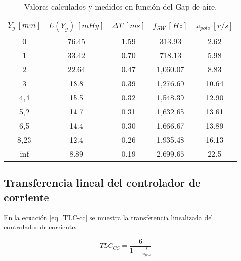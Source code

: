 \begin{table}[H]
	\begin{center}
		\begin{tabular}{| c | c | c | c | c |}
			\hline
			$Y_g\:[mm]$ & $L(Y_g)\:[mHy]$ & $\Delta T\:[ms]$ & $f_{SW}\:[Hz]$ & $\omega _{polo}\:[r/s]$\\ \hline
			0 & 76.45 & 1.59 & 313.93 & 2.62\\ \hline
			1 & 33.42 & 0.70 & 718.13 & 5.98\\ \hline
			2 & 22.64 &	0.47 & 1,060.07 & 8.83\\ \hline
			3 &	18.8 & 0.39 & 1,276.60 & 10.64\\ \hline
			4,4 & 15.5 & 0.32 & 1,548.39 & 12.90\\ \hline
			5,2 & 14.7 & 0.31 & 1,632.65 & 13.61\\ \hline
			6,5 & 14.4 & 0.30 & 1,666.67 & 13.89\\ \hline
			8,23 & 12.4 & 0.26 & 1,935.48 & 16.13\\ \hline
			inf & 8.89 & 0.19 & 2,699.66 & 22.5	\\ \hline
		\end{tabular}
		\caption{Valores calculados y medidos en función del Gap de aire.}
		\label{tab_mediciones}
	\end{center}
\end{table}

\subsection{Transferencia lineal del controlador de corriente}

\noindent En la ecuación \ref{eq_TLC-cc} se muestra la transferencia linealizada del controlador de corriente.

\begin{equation} \label{eq_TLC-cc}
TLC_{CC} = \frac{6}{1+\frac{s}{\omega _{polo}}}
\end{equation}

